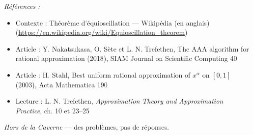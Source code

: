 \documentclass[11pt]{article}
\newenvironment{refs}{\par\small\noindent\emph{Références :}\begin{itemize}\setlength\itemsep{0pt}}{\end{itemize}\normalsize}
\begin{document}
\begin{refs}
\item Contexte : Théorème d'équioscillation --- Wikipédia (en anglais) (\url{https://en.wikipedia.org/wiki/Equioscillation_theorem})
\item Article : Y. Nakatsukasa, O. Sète et L. N. Trefethen, \og{} The AAA algorithm for rational approximation \fg{} (2018), SIAM Journal on Scientific Computing 40
\item Article : H. Stahl, \og{} Best uniform rational approximation of $x^{\alpha}$ on $[0,1]$ \fg{} (2003), Acta Mathematica 190
\item Lecture : L. N. Trefethen, \textit{Approximation Theory and Approximation Practice}, ch. 10 et 23--25
\end{refs}

\bigskip


\vfill
\noindent\emph{Hors de la Caverne} --- des probl\`emes, pas de r\'eponses.
\end{document}

